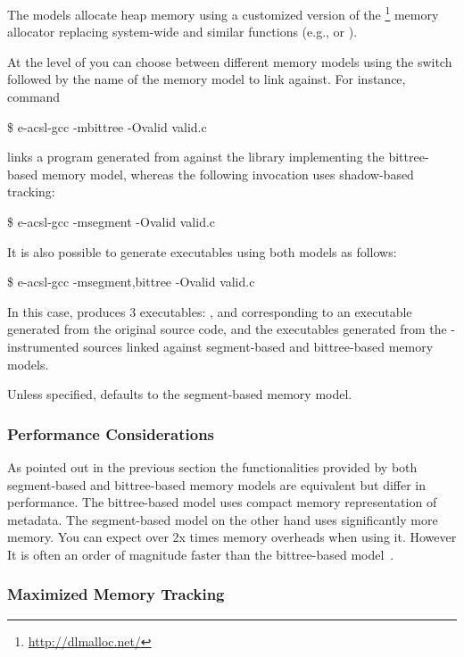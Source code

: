 The \eacsl models allocate heap memory using a customized version of the
\dlmalloc\footnote{\url{http://dlmalloc.net/}} memory allocator replacing
system-wide  and similar functions (e.g.,  or ).

At the level of \eacslgcc you can choose between different memory models using
the  switch followed by the name of the memory model to link
against.  For instance, command
\begin{logs}
\$ e-acsl-gcc -mbittree -Ovalid valid.c
\end{logs}
links a program generated from  against the library implementing the
bittree-based memory model, whereas the following invocation uses shadow-based
tracking:
\begin{logs}
\$ e-acsl-gcc -msegment -Ovalid valid.c
\end{logs}
It is also possible to generate executables using both models as follows:
\begin{logs}
\$ e-acsl-gcc -msegment,bittree -Ovalid valid.c
\end{logs}
In this case, \eacslgcc produces 3 executables: ,
 and  corresponding to an
executable generated from the original source code, and the executables
generated from the \eacsl-instrumented sources linked against
segment-based and bittree-based memory models.

Unless specified, \eacsl defaults to the segment-based memory model.

\subsubsection{Performance Considerations}
\label{sec:perf}

As pointed out in the previous section the functionalities provided by both
segment-based and bittree-based memory models are equivalent but differ in
performance. The bittree-based model uses compact memory representation of
metadata. The segment-based model on the other hand uses significantly more
memory. You can expect over 2x times memory overheads when using it. However It
is often an order of magnitude faster than the bittree-based
model~\cite{vorobyov17ismm}.


\subsubsection{Maximized Memory Tracking}

